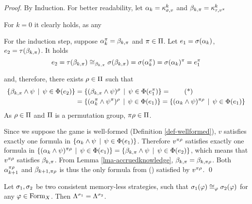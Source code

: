 \begin{proof}
By Induction. For better readability, let
  $\alpha_k = \kappa_{\sigma, v}^{k}$ and
  $\beta_{k, \pi} = \kappa_{\tau, v^\pi}^{k}$

For $k=0$ it clearly holds, as any 

For the induction step, suppose $\alpha_k^\pi = \beta_{k, \pi}$ and $\pi\in \Pi$.
Let $e_1 = \sigma(\alpha_k)$, $e_2 = \tau(\beta_{k, \pi})$. It holds
\[
e_2 = \tau(\beta_{k, \pi})
    \cong_{\beta_{k, \pi}}   \sigma(\beta_{k, \pi})
    = \sigma(\alpha_k^\pi)
    = \sigma(\alpha_k)^\pi
    = e_1^\pi
\]

and, therefore, there exists $\rho\in\Pi$ such that
\begin{align}
 \{ \beta_{k, \pi} \wedge \psi \:\:|\:\: \psi\in\Phi(e_2) \} &=
 \{ (\beta_{k, \pi} \wedge \psi)^\rho \:\:|\:\: \psi\in\Phi(e_1^\pi) \} = \label{eq:sets}\tag{*}\\
&= \{ (\alpha_k^\pi \wedge \psi^\pi)^\rho \:\:|\:\: \psi\in\Phi(e_1) \} =
 \{ (\alpha_k \wedge \psi)^{\pi\rho} \:\:|\:\: \psi\in\Phi(e_1) \}
\end{align}
As $\rho\in\Pi$ and $\Pi$ is a permutation group, $\pi\rho\in\Pi$.

Since we suppose the game is well-formed (Definition \ref{def-wellformed}),
  $v$ satisfies exactly one formula in
  $\{ \alpha_k \wedge \psi \:\:|\:\: \psi\in\Phi(e_1) \}$.
Therefore $v^{\pi\rho}$ satisfies exactly one formula
  in
  $\{ (\alpha_k \wedge \psi)^{\pi\rho} \:\:|\:\: \psi\in\Phi(e_1) \}  =
   \{ \beta_{k, \pi} \wedge \psi \:\:|\:\: \psi\in\Phi(e_2) \}$,
  which means that $v^{\pi\rho}$ satisfies $\beta_{k, \pi}$.
From Lemma \ref{lma-accruedknowledge}, $\beta_{k, \pi} = \beta_{k, \pi\rho}$.
Both $\alpha_{k+1}^{\pi\rho}$ and $\beta_{k+1, \pi\rho}$ is thus the only
  formula from () satisfied by $v^{\pi\rho}$. \qed
\end{proof}

\begin{corollary}
Let $\sigma_1, \sigma_2$ be two consistent memory-less strategies, such that
$\sigma_1(\varphi) \cong_{\varphi} \sigma_2(\varphi)$ for any $\varphi\in\textrm{Form}_X$.
Then $\Lambda^{\sigma_1} = \Lambda^{\sigma_2}$.
\end{corollary}


